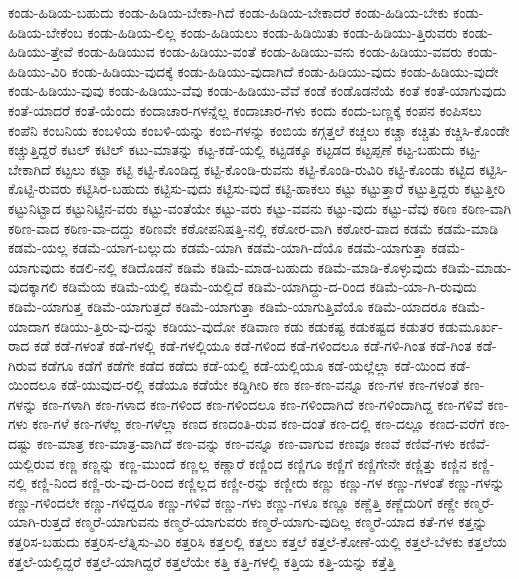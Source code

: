 {ಕಂಡು-ಹಿಡಿಯ-ಬಹುದು
ಕಂಡು-ಹಿಡಿಯ-ಬೇಕಾ-ಗಿದೆ
ಕಂಡು-ಹಿಡಿಯ-ಬೇಕಾದರೆ
ಕಂಡು-ಹಿಡಿಯ-ಬೇಕು
ಕಂಡು-ಹಿಡಿಯ-ಬೇಕೆಂಬ
ಕಂಡು-ಹಿಡಿಯ-ಲಿಲ್ಲ
ಕಂಡು-ಹಿಡಿಯಲು
ಕಂಡು-ಹಿಡಿಯಿತು
ಕಂಡು-ಹಿಡಿಯು-ತ್ತಿರುವರು
ಕಂಡು-ಹಿಡಿಯು-ತ್ತೇವೆ
ಕಂಡು-ಹಿಡಿಯುವ
ಕಂಡು-ಹಿಡಿಯು-ವಂತೆ
ಕಂಡು-ಹಿಡಿಯು-ವನು
ಕಂಡು-ಹಿಡಿಯು-ವವರು
ಕಂಡು-ಹಿಡಿಯು-ವಿರಿ
ಕಂಡು-ಹಿಡಿಯು-ವುದಕ್ಕೆ
ಕಂಡು-ಹಿಡಿಯು-ವುದಾಗಿದೆ
ಕಂಡು-ಹಿಡಿಯು-ವುದು
ಕಂಡು-ಹಿಡಿಯು-ವುದೇ
ಕಂಡು-ಹಿಡಿಯು-ವುವು
ಕಂಡು-ಹಿಡಿಯು-ವೆವು
ಕಂಡು-ಹಿಡಿಯು-ವೆವೆ
ಕಂಡೆ
ಕಂಡೊಡನೆಯೆ
ಕಂತೆ
ಕಂತೆ-ಯಾಗುವುದು
ಕಂತೆ-ಯಾದರೆ
ಕಂತೆ-ಯೆಂದು
ಕಂದಾಚಾರ-ಗಳನ್ನೆಲ್ಲ
ಕಂದಾಚಾರ-ಗಳು
ಕಂದು
ಕಂದು-ಬಣ್ಣಕ್ಕೆ
ಕಂಪನ
ಕಂಪಿಸಲು
ಕಂಪೆನಿ
ಕಂಬನಿಯ
ಕಂಬಳಿಯ
ಕಂಬಳಿ-ಯನ್ನು
ಕಂಬಿ-ಗಳನ್ನು
ಕಂಬಿಯ
ಕಗ್ಗತ್ತಲೆ
ಕಚ್ಚಲು
ಕಚ್ಚಾ
ಕಚ್ಚಿತು
ಕಚ್ಚಿಸಿ-ಕೊಂಡೇ
ಕಚ್ಚುತ್ತಿದ್ದರೆ
ಕಟಲ್
ಕಟಿಲ್
ಕಟು-ಮಾತನ್ನು
ಕಟ್ಟ-ಕಡೆ-ಯಲ್ಲಿ
ಕಟ್ಟಡಕ್ಕೂ
ಕಟ್ಟಡದ
ಕಟ್ಟಪ್ಪಣೆ
ಕಟ್ಟ-ಬಹುದು
ಕಟ್ಟ-ಬೇಕಾಗಿದೆ
ಕಟ್ಟಲು
ಕಟ್ಟಾ
ಕಟ್ಟಿ
ಕಟ್ಟಿ-ಕೊಂಡಿದ್ದ
ಕಟ್ಟಿ-ಕೊಂಡಿ-ರುವನು
ಕಟ್ಟಿ-ಕೊಂಡಿ-ರುವಿರಿ
ಕಟ್ಟಿ-ಕೊಂಡು
ಕಟ್ಟಿದ
ಕಟ್ಟಿಸಿ-ಕೊಟ್ಟಿ-ರುವರು
ಕಟ್ಟಿಸಿರ-ಬಹುದು
ಕಟ್ಟಿಸು-ವುದು
ಕಟ್ಟಿಸು-ವುದೆ
ಕಟ್ಟಿ-ಹಾಕಲು
ಕಟ್ಟು
ಕಟ್ಟುತ್ತಾರೆ
ಕಟ್ಟುತ್ತಿದ್ದರು
ಕಟ್ಟುತ್ತೀರಿ
ಕಟ್ಟುನಿಟ್ಟಾದ
ಕಟ್ಟುನಿಟ್ಟಿನ-ವರು
ಕಟ್ಟು-ವಂತೆಯೇ
ಕಟ್ಟು-ವರು
ಕಟ್ಟು-ವವನು
ಕಟ್ಟು-ವುದು
ಕಟ್ಟು-ವೆವು
ಕಠಿಣ
ಕಠಿಣ-ವಾಗಿ
ಕಠಿಣ-ವಾದ
ಕಠಿಣ-ವಾ-ದದ್ದು
ಕಠಿಣವೇ
ಕಠೋಪನಿಷತ್ತಿ-ನಲ್ಲಿ
ಕಠೋರ-ವಾಗಿ
ಕಠೋರ-ವಾದ
ಕಡಮೆ
ಕಡಮೆ-ಮಾಡಿ
ಕಡಮೆ-ಯಲ್ಲ
ಕಡಮೆ-ಯಾಗ-ಬಲ್ಲುದು
ಕಡಮೆ-ಯಾಗಿ
ಕಡಮೆ-ಯಾಗಿ-ದೆಯೊ
ಕಡಮೆ-ಯಾಗುತ್ತಾ
ಕಡಮೆ-ಯಾಗುವುದು
ಕಡಲಿ-ನಲ್ಲಿ
ಕಡಿದೊಡನೆ
ಕಡಿಮೆ
ಕಡಿಮೆ-ಮಾಡ-ಬಹುದು
ಕಡಿಮೆ-ಮಾಡಿ-ಕೊಳ್ಳುವುದು
ಕಡಿಮೆ-ಮಾಡು-ವುದಕ್ಕಾಗಲಿ
ಕಡಿಮೆಯ
ಕಡಿಮೆ-ಯಲ್ಲಿ
ಕಡಿಮೆ-ಯಲ್ಲಿದೆ
ಕಡಿಮೆ-ಯಾಗಿದ್ದು-ದ-ರಿಂದ
ಕಡಿಮೆ-ಯಾ-ಗಿ-ರುವುದು
ಕಡಿಮೆ-ಯಾಗುತ್ತ
ಕಡಿಮೆ-ಯಾಗುತ್ತದೆ
ಕಡಿಮೆ-ಯಾಗುತ್ತಾ
ಕಡಿಮೆ-ಯಾಗುತ್ತಿವೆಯೊ
ಕಡಿಮೆ-ಯಾದರೂ
ಕಡಿಮೆ-ಯಾದಾಗ
ಕಡಿಯು-ತ್ತಿರು-ವು-ದನ್ನು
ಕಡಿಯು-ವುದೋ
ಕಡಿವಾಣ
ಕಡು
ಕಡುಕಷ್ಟ
ಕಡುಕಷ್ಟದ
ಕಡುತರ
ಕಡುಮೂರ್ಖ-ರಾದ
ಕಡೆ
ಕಡೆ-ಗಳಂತೆ
ಕಡೆ-ಗಳಲ್ಲಿ
ಕಡೆ-ಗಳಲ್ಲಿಯೂ
ಕಡೆ-ಗಳಿಂದ
ಕಡೆ-ಗಳಿಂದಲೂ
ಕಡೆ-ಗಳಿ-ಗಿಂತ
ಕಡೆ-ಗಿಂತ
ಕಡೆ-ಗಿರುವ
ಕಡೆಗೂ
ಕಡೆಗೆ
ಕಡೆಗೇ
ಕಡೆದ
ಕಡೆದು
ಕಡೆ-ಯಲ್ಲಿ
ಕಡೆ-ಯಲ್ಲಿಯೂ
ಕಡೆ-ಯಲ್ಲೆಲ್ಲಾ
ಕಡೆ-ಯಿಂದ
ಕಡೆ-ಯಿಂದಲೂ
ಕಡೆ-ಯುವುದ-ರಲ್ಲಿ
ಕಡೆಯೂ
ಕಡೆಯೇ
ಕಡ್ಡಿಗೀರಿ
ಕಣ
ಕಣ-ಕಣ-ವನ್ನೂ
ಕಣ-ಗಳ
ಕಣ-ಗಳಂತೆ
ಕಣ-ಗಳನ್ನು
ಕಣ-ಗಳಾಗಿ
ಕಣ-ಗಳಾದ
ಕಣ-ಗಳಿಂದ
ಕಣ-ಗಳಿಂದಲೂ
ಕಣ-ಗಳಿಂದಾಗಿದೆ
ಕಣ-ಗಳಿಂದಾಗಿದ್ದ
ಕಣ-ಗಳಿವೆ
ಕಣ-ಗಳು
ಕಣ-ಗಳೆ
ಕಣ-ಗಳೆಲ್ಲ
ಕಣ-ಗಳೆಲ್ಲಾ
ಕಣದ
ಕಣದಂತಿ-ರುವ
ಕಣ-ದಂತೆ
ಕಣ-ದಲ್ಲಿ
ಕಣ-ದಲ್ಲೂ
ಕಣದ-ವರೆಗೆ
ಕಣ-ದಷ್ಟು
ಕಣ-ಮಾತ್ರ
ಕಣ-ಮಾತ್ರ-ವಾಗಿದೆ
ಕಣ-ವನ್ನು
ಕಣ-ವನ್ನೂ
ಕಣ-ವಾಗುವ
ಕಣವೂ
ಕಣವೆ
ಕಣಿವೆ-ಗಳು
ಕಣಿವೆ-ಯಲ್ಲಿರುವ
ಕಣ್ಣ
ಕಣ್ಣನ್ನು
ಕಣ್ಣ-ಮುಂದೆ
ಕಣ್ಣಲ್ಲ
ಕಣ್ಣಾರೆ
ಕಣ್ಣಿಂದ
ಕಣ್ಣಿಗೂ
ಕಣ್ಣಿಗೆ
ಕಣ್ಣಿಗೇನೇ
ಕಣ್ಣಿತ್ತು
ಕಣ್ಣಿನ
ಕಣ್ಣಿ-ನಲ್ಲಿ
ಕಣ್ಣಿ-ನಿಂದ
ಕಣ್ಣಿ-ರು-ವು-ದ-ರಿಂದ
ಕಣ್ಣಿಲ್ಲದ
ಕಣ್ಣೀ-ರನ್ನು
ಕಣ್ಣೀರು
ಕಣ್ಣು
ಕಣ್ಣು-ಗಳ
ಕಣ್ಣು-ಗಳಂತೆ
ಕಣ್ಣು-ಗಳನ್ನು
ಕಣ್ಣು-ಗಳಿಂದಲೇ
ಕಣ್ಣು-ಗಳಿದ್ದರೂ
ಕಣ್ಣು-ಗಳಿವೆ
ಕಣ್ಣು-ಗಳು
ಕಣ್ಣು-ಗಳೂ
ಕಣ್ಣೂ
ಕಣ್ಣೆತ್ತಿ
ಕಣ್ಣೆದುರಿಗೆ
ಕಣ್ಣೇ
ಕಣ್ಮರೆ-ಯಾಗಿ-ರುತ್ತದೆ
ಕಣ್ಮರೆ-ಯಾಗುವನು
ಕಣ್ಮರೆ-ಯಾಗುವರು
ಕಣ್ಮರೆ-ಯಾಗು-ವುದಿಲ್ಲ
ಕಣ್ಮರೆ-ಯಾದ
ಕತೆ-ಗಳ
ಕತ್ತನ್ನು
ಕತ್ತರಿಸ-ಬಹುದು
ಕತ್ತರಿಸ-ಲೆತ್ನಿಸು-ವಿರಿ
ಕತ್ತರಿಸಿ
ಕತ್ತಲಲ್ಲಿ
ಕತ್ತಲು
ಕತ್ತಲೆ
ಕತ್ತಲೆ-ಕೋಣೆ-ಯಲ್ಲಿ
ಕತ್ತಲೆ-ಬೆಳಕು
ಕತ್ತಲೆಯ
ಕತ್ತಲೆ-ಯಲ್ಲಿದ್ದರೆ
ಕತ್ತಲೆ-ಯಾಗಿದ್ದರೆ
ಕತ್ತಲೆಯೇ
ಕತ್ತಿ
ಕತ್ತಿ-ಗಳಲ್ಲಿ
ಕತ್ತಿಯ
ಕತ್ತಿ-ಯನ್ನು
ಕತ್ತೆತ್ತಿ
}

